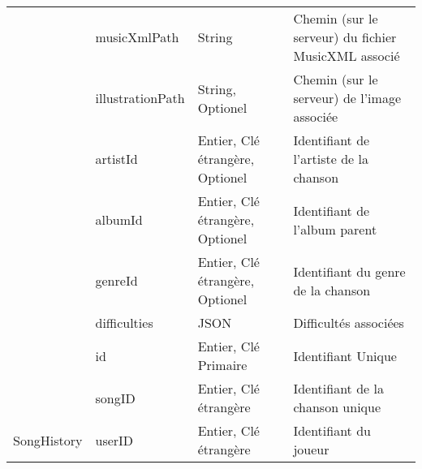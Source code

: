 \begin{longtable}[c]{@{}|p{}|p{}|p{}|p{}|@{}}
														& musicXmlPath                                         & String                                                                                   & Chemin (sur le serveur) du fichier MusicXML associé                                      \\* \cline{2-4} 
														& illustrationPath                                     & String, Optionel                                                                         & Chemin (sur le serveur) de l’image associée                                              \\* \cline{2-4} 
														& artistId                                             & Entier, Clé étrangère, Optionel                                                          & Identifiant de l’artiste de la chanson                                                   \\* \cline{2-4} 
														& albumId                                              & Entier, Clé étrangère, Optionel                                                          & Identifiant de l’album parent                                                            \\* \cline{2-4} 
														& genreId                                              & Entier, Clé étrangère, Optionel                                                          & Identifiant du genre de la chanson                                                       \\* \cline{2-4} 
							                            & difficulties                                         & JSON                                                                                     & Difficultés associées                                                                    \\* \hline
														& id                                                   & Entier, Clé Primaire                                                                     & Identifiant Unique                                                                       \\* \cline{2-4} 
														& songID                                               & Entier, Clé étrangère                                                                    & Identifiant de la chanson unique                                                         \\* \cline{2-4} 
	\multirow{-3}{*}{SongHistory}						& userID                                               & Entier, Clé étrangère                                                                    & Identifiant du joueur                                                                    \\* \cline{2-4} 

\end{longtable}
